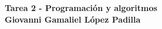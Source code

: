 \begin{center}
	\textbf{
		\textcolor{title}{Tarea 2 - Programación y algoritmos\\Giovanni Gamaliel López Padilla}}
\end{center}
